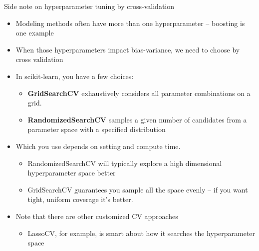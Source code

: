 \documentclass[mathserif, aspectratio=169]{beamer}
\begin{document}
\begin{frame}{Side note on hyperparameter tuning by cross-validation}
\begin{itemize}
	\item Modeling methods often have more than one hyperparameter -- boosting is one example
	\item When those hyperparameters impact bias-variance, we need to choose by cross validation
	\item In scikit-learn, you have a few choices:
	\begin{itemize}
		\item \textbf{GridSearchCV} exhaustively considers all parameter combinations on a grid.
		\item \textbf{RandomizedSearchCV} samples a given number of candidates from a parameter space with a specified distribution
	\end{itemize}
	\item Which you use depends on setting and compute time.  

	\pause
	
	\begin{itemize}
		\item RandomizedSearchCV will typically explore a high dimensional hyperparameter space better
		\item GridSearchCV guarantees you sample all the space evenly -- if you want tight, uniform coverage it's better.
	\end{itemize}
	\item Note that there are other customized CV approaches
	\begin{itemize}
		\item LassoCV, for example, is smart about how it searches the hyperparameter space
	\end{itemize}
\end{itemize}
\end{frame}
\end{document}
